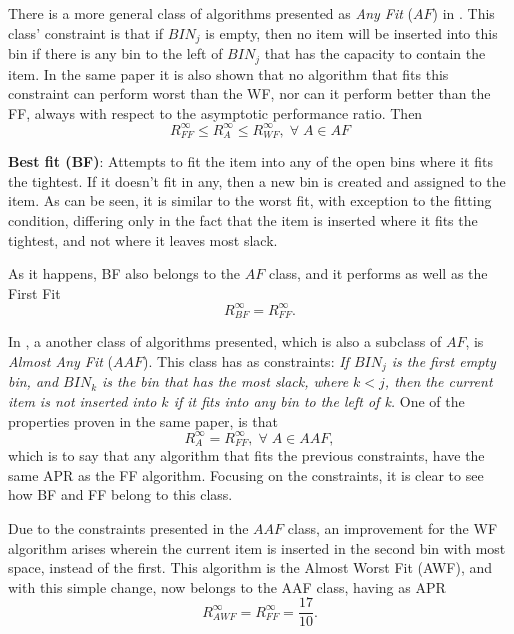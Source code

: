 There is a more general class of algorithms presented as \textit{Any Fit} ($AF$)
in \cite{johnson1974fast}. This class' constraint is that if $BIN_j$ is empty,
then no item will be inserted into this bin if there is any bin to the left of
$BIN_j$ that has the capacity to contain the item. In the same paper it is also
shown that no algorithm that fits this constraint can perform worst than the WF,
nor can it perform better than the FF, always with respect to the asymptotic
performance ratio. Then
\begin{equation}
    R_{FF}^\infty \leq R_A^\infty \leq R_{WF}^\infty, \; \forall \; A \in AF
\end{equation}

\textbf{Best fit (BF)}: Attempts to fit the item into any of the open bins where
it fits the tightest. If it doesn't fit in any, then a new bin is created and
assigned to the item. As can be seen, it is similar to the worst fit, with
exception to the fitting condition, differing only in the fact that the item is
inserted where it fits the tightest, and not where it leaves most slack.

As it happens, BF also belongs to the $AF$ class, and it performs as well as the
First Fit
\begin{equation}
    R_{BF}^\infty = R_{FF}^\infty.
\end{equation}

In \cite{johnson1974fast}, a another class of algorithms presented, which is
also a subclass of $AF$, is \textit{Almost Any Fit} ($AAF$). This class has as
constraints: \textit{If $BIN_j$ is the first empty bin, and $BIN_k$ is the bin
that has the most slack, where $k < j$, then the current item is not inserted
into $k$ if it fits into any bin to the left of k.} One of the properties proven
in the same paper, is that 
\begin{equation}
    R_A^\infty = R_{FF}^\infty, \; \forall \; A \in AAF,
\end{equation}
which is to say that any algorithm that fits the previous constraints, have the
same APR as the FF algorithm. Focusing on the constraints, it is clear to see
how BF and FF belong to this class. 

Due to the constraints presented in the $AAF$ class, an improvement for the WF
algorithm arises wherein the current item is inserted in the second bin with
most space, instead of the first. This algorithm is the Almost Worst Fit (AWF),
and with this simple change, now belongs to the AAF class, having as APR
\begin{equation}
    R_{AWF}^\infty = R_{FF}^\infty = \frac{17}{10}.
\end{equation}

